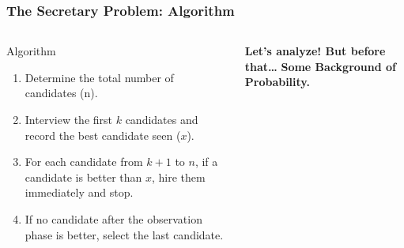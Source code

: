   \begin{frame}
      \frametitle{The Secretary Problem: Algorithm}
      \begin{columns}[t]
          \begin{block}{Algorithm}
            \begin{enumerate}
              \item Determine the total number of candidates (n).
              \item Interview the first $k$ candidates and record the best candidate seen ($x$).
              \item For each candidate from $k+1$ to $n$, if a candidate is better than $x$, hire them immediately and stop.
              \item If no candidate after the observation phase is better, select the last candidate.
            \end{enumerate}
          \end{block}
          \centering
          \vspace*{3cm} %
          {\color{red}\textbf{}}
          {\color{red}\textbf{}}
          {\color{red}\textbf{}}
          {\color{red}\textbf{Let's analyze! But before that…}}
          {\color{red}\textbf{Some Background of Probability.}}
      \end{columns}
    \end{frame}
    
